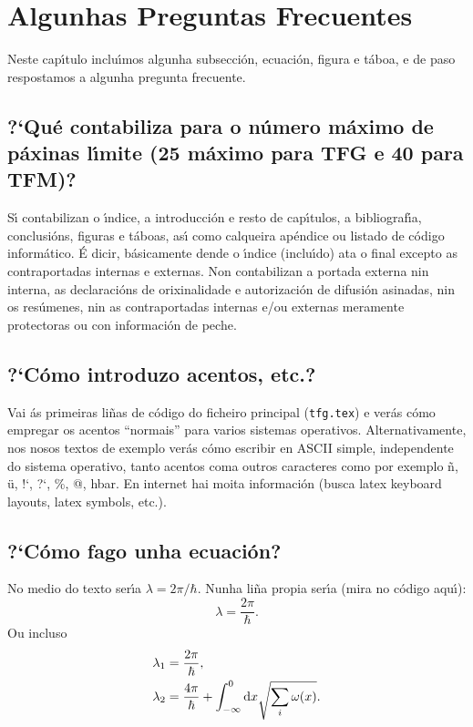 \section{Algunhas Preguntas Frecuentes}

Neste cap\'{\i}tulo inclu\'{\i}mos algunha subsecci\'on, ecuaci\'on, figura e t\'aboa, e de paso respostamos a algunha pregunta frecuente.


\subsection{?`Qu\'e contabiliza para o n\'umero m\'aximo de p\'axinas l\'{\i}mite (25  m\'aximo para TFG e 40 para TFM)?}\label{quecontabiliza}
 S\'{\i} contabilizan o \'{\i}ndice, a introducci\'on e resto de cap\'{\i}tulos, a bibliograf\'{\i}a, conclusi\'ons, figuras e t\'aboas, as\'{\i} como calqueira ap\'endice ou listado de c\'odigo inform\'atico. \'E dicir, b\'asicamente dende o \'{\i}ndice (inclu\'{\i}do) ata o final excepto as contraportadas internas e externas.
Non contabilizan a portada externa nin interna, as declaraci\'ons de orixinalidade e autorizaci\'on de difusi\'on asinadas, nin os  res\'umenes, nin as contraportadas internas e/ou externas meramente protectoras ou con informaci\'on de peche.

\subsection{?`C\'omo introduzo acentos, etc.?}
Vai \'as primeiras li\~nas de c\'odigo do ficheiro principal ({\tt tfg.tex}) e ver\'as c\'omo empregar os acentos ``normais'' para varios sistemas operativos. Alternativamente, nos nosos textos de exemplo ver\'as c\'omo escribir en ASCII simple, independente do sistema operativo, tanto acentos coma outros caracteres como por exemplo \~n, \"u, !`, ?`, \%, @, hbar. En internet hai moita informaci\'on (busca latex keyboard layouts, latex symbols, etc.).

\subsection{?`C\'omo fago unha ecuaci\'on?}
No medio do texto ser\'{\i}a $\lambda=2\pi/\hbar$. Nunha li\~na propia ser\'{\i}a  (mira no c\'odigo aqu\'{\i}): 
% 
\begin{equation}
\lambda=\frac{2\pi}{\hbar}.
\label{eq-lambda}
\end{equation}
Ou incluso
%
\begin{subequations}\label{todaaecuacion}%
\begin{align}%
\lambda_1&=\frac{2\pi}{\hbar},\\
\lambda_2&=\frac{4\pi}{\hbar}+\int_{-\infty}^0{\rm d}x \sqrt{\sum_i\omega(x)}.\label{partedaecuacion}
\end{align}
\end{subequations}
%

